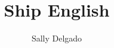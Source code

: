 \author{Sally Delgado}
\title{Ship English}
\subtitle{}
\renewcommand{\lsSeries}{sidl}
\renewcommand{\lsSeriesNumber}{}
